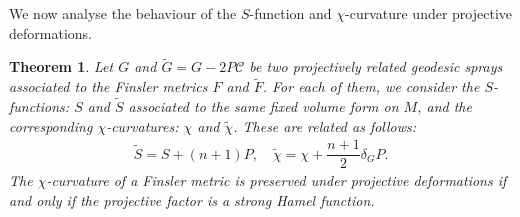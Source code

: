 \documentclass[oneside,english]{amsart}
\newtheorem{theorem}{Theorem}[section]
\theoremstyle{definition}
\theoremstyle{plain}
\theoremstyle{plain}
\theoremstyle{plain}
\theoremstyle{remark}
\theoremstyle{remark}
\theoremstyle{remark}
\begin{document}
We now analyse the behaviour of the $S$-function and $\chi$-curvature under projective deformations.
\begin{theorem}\label{thm:schi}
Let $G$ and $\widetilde{G}=G-2P\mathcal{C}$ be two projectively related geodesic sprays associated to the Finsler metrics $F$ and $\widetilde{F}$. For each of them, we consider the $S$-functions: $S$ and $\widetilde{S}$ associated to the same fixed volume form on $M$, and the corresponding $\chi$-curvatures: $\chi$ and $\widetilde{\chi}$. These are related as follows:
\begin{eqnarray}
\widetilde{S}=S+(n+1)P, \quad \widetilde{\chi}=\chi+\dfrac{n+1}{2}\delta_GP. \label{schiproj}
\end{eqnarray}
The $\chi$-curvature of a Finsler metric is preserved under projective deformations if and only if the projective factor is a strong Hamel function. 
\end{theorem}
\end{document}
